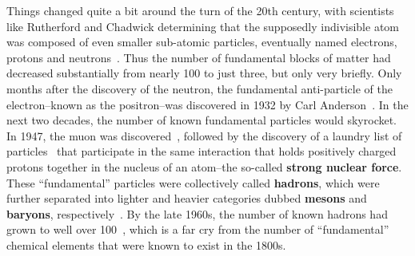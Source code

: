 Things changed quite a bit around the turn of the 20th century, with scientists like Rutherford and Chadwick determining that the supposedly indivisible atom was composed of even smaller sub-atomic particles, eventually named electrons, protons and neutrons~\cite{Electrons, Protons, Neutrons}. Thus the number of fundamental blocks of matter had decreased substantially from nearly 100 to just three, but only very briefly. Only months after the discovery of the neutron, the fundamental anti-particle of the electron--known as the positron--was discovered in 1932 by Carl Anderson~\cite{Positron}. In the next two decades, the number of known fundamental particles would skyrocket. In 1947, the muon was discovered~\cite{Muon}, followed by the discovery of a laundry list of particles~\cite{Kaon,Lambda,Sigma} that participate in the same interaction that holds positively charged protons together in the nucleus of an atom--the so-called \textbf{strong nuclear force}. These ``fundamental'' particles were collectively called \textbf{hadrons}, which were further separated into lighter and heavier categories dubbed \textbf{mesons} and \textbf{baryons}, respectively~\cite{MesonBaryon}. By the late 1960s, the number of known hadrons had grown to well over 100~\cite{ParticleDiscoveries}, which is a far cry from the number of ``fundamental'' chemical elements that were known to exist in the 1800s.

